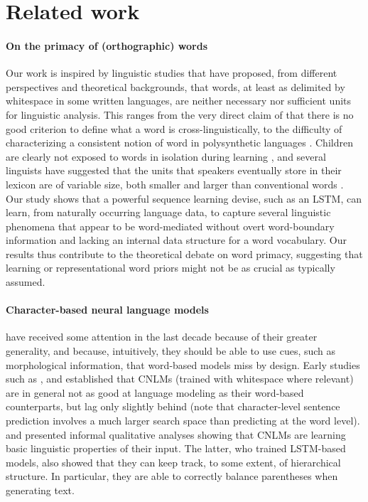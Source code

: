 \section{Related work}
\label{sec:related}

\paragraph{On the primacy of (orthographic) words} Our work is
inspired by linguistic studies that have proposed, from different
perspectives and theoretical backgrounds, that words, at least as
delimited by whitespace in some written languages, are neither
necessary nor sufficient units for linguistic analysis. This ranges
from the very direct claim of  that there is
no good criterion to define what a word is cross-linguistically, to
the difficulty of characterizing a consistent notion of word in
polysynthetic languages \cite{Bickel:Zuniga:2017}. Children are
clearly not exposed to words in isolation during learning
\cite{Tomasello:2003}, and several linguists have suggested that the
units that speakers eventually store in their lexicon are of variable
size, both smaller and larger than conventional words
\cite[e.g.,]{Jackendoff:2002,Goldberg:2005}. Our study shows that a
powerful sequence learning devise, such as an LSTM, can learn, from
naturally occurring language data, to capture several linguistic
phenomena that appear to be word-mediated without overt word-boundary
information and lacking an internal data structure for a word
vocabulary. Our results thus contribute to the theoretical debate on
word primacy, suggesting that learning or representational word priors
might not be as crucial as typically assumed.

\paragraph{Character-based neural language models} have received some attention in the last
decade because of their greater generality, and because, intuitively, they should be able to
use cues, such as morphological information, that word-based models
miss by design. Early studies such as ,
 and  established
that CNLMs (trained with whitespace where relevant) are in general not
as good at language modeling as their word-based counterparts, but lag
only slightly behind (note that character-level sentence prediction
involves a much larger search space than predicting at the word
level).  and 
presented informal qualitative analyses showing that CNLMs are
learning basic linguistic properties of their input. The latter, who
trained LSTM-based models, also showed that they can keep track, to
some extent, of hierarchical structure. In particular, they are able
to correctly balance parentheses when generating text.

